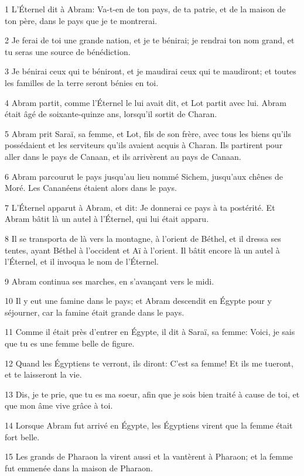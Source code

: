 \par 1 L'Éternel dit à Abram: Va-t-en de ton pays, de ta patrie, et de la maison de ton père, dans le pays que je te montrerai.
\par 2 Je ferai de toi une grande nation, et je te bénirai; je rendrai ton nom grand, et tu seras une source de bénédiction.
\par 3 Je bénirai ceux qui te béniront, et je maudirai ceux qui te maudiront; et toutes les familles de la terre seront bénies en toi.
\par 4 Abram partit, comme l'Éternel le lui avait dit, et Lot partit avec lui. Abram était âgé de soixante-quinze ans, lorsqu'il sortit de Charan.
\par 5 Abram prit Saraï, sa femme, et Lot, fils de son frère, avec tous les biens qu'ils possédaient et les serviteurs qu'ils avaient acquis à Charan. Ils partirent pour aller dans le pays de Canaan, et ils arrivèrent au pays de Canaan.
\par 6 Abram parcourut le pays jusqu'au lieu nommé Sichem, jusqu'aux chênes de Moré. Les Cananéens étaient alors dans le pays.
\par 7 L'Éternel apparut à Abram, et dit: Je donnerai ce pays à ta postérité. Et Abram bâtit là un autel à l'Éternel, qui lui était apparu.
\par 8 Il se transporta de là vers la montagne, à l'orient de Béthel, et il dressa ses tentes, ayant Béthel à l'occident et Aï à l'orient. Il bâtit encore là un autel à l'Éternel, et il invoqua le nom de l'Éternel.
\par 9 Abram continua ses marches, en s'avançant vers le midi.
\par 10 Il y eut une famine dans le pays; et Abram descendit en Égypte pour y séjourner, car la famine était grande dans le pays.
\par 11 Comme il était près d'entrer en Égypte, il dit à Saraï, sa femme: Voici, je sais que tu es une femme belle de figure.
\par 12 Quand les Égyptiens te verront, ils diront: C'est sa femme! Et ils me tueront, et te laisseront la vie.
\par 13 Dis, je te prie, que tu es ma soeur, afin que je sois bien traité à cause de toi, et que mon âme vive grâce à toi.
\par 14 Lorsque Abram fut arrivé en Égypte, les Égyptiens virent que la femme était fort belle.
\par 15 Les grands de Pharaon la virent aussi et la vantèrent à Pharaon; et la femme fut emmenée dans la maison de Pharaon.
